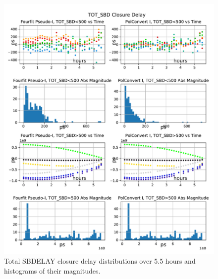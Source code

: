 \documentclass[letterpaper,twoside,12pt]{article}
\begin{document}
\begin{figure}[ht!]
  \begin{center}
  \includegraphics[width=35pc]{TOT_SBD_Closure_Delay.pdf}
  \caption{\small Total SBDELAY closure delay distributions over 5.5 hours and histograms of their magnitudes.}
  \label{tot_sbd}
  \end{center}
\end{figure}
\end{document}
